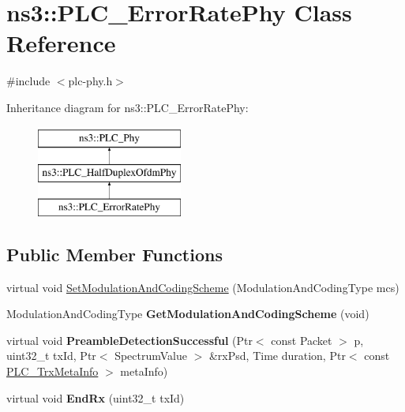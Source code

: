 \hypertarget{classns3_1_1PLC__ErrorRatePhy}{\section{ns3\-:\-:\-P\-L\-C\-\_\-\-Error\-Rate\-Phy \-Class \-Reference}
\label{classns3_1_1PLC__ErrorRatePhy}
}


{\ttfamily \#include $<$plc-\/phy.\-h$>$}

\-Inheritance diagram for ns3\-:\-:\-P\-L\-C\-\_\-\-Error\-Rate\-Phy\-:\begin{figure}[H]
\begin{center}
\leavevmode
\includegraphics[height=3.000000cm]{classns3_1_1PLC__ErrorRatePhy}
\end{center}
\end{figure}
\subsection*{\-Public \-Member \-Functions}
\begin{DoxyCompactItemize}
\item 
virtual void \hyperlink{classns3_1_1PLC__ErrorRatePhy_a108a0f187ead3c1a8aa90d03f95bd653}{\-Set\-Modulation\-And\-Coding\-Scheme} (\-Modulation\-And\-Coding\-Type mcs)
\item 
\hypertarget{classns3_1_1PLC__ErrorRatePhy_a158678f9689b9111992c3137f6a0ed57}{\-Modulation\-And\-Coding\-Type {\bfseries \-Get\-Modulation\-And\-Coding\-Scheme} (void)}\label{classns3_1_1PLC__ErrorRatePhy_a158678f9689b9111992c3137f6a0ed57}

\item 
\hypertarget{classns3_1_1PLC__ErrorRatePhy_ab7bdbe350667587e50ce06413ae2df7b}{virtual void {\bfseries \-Preamble\-Detection\-Successful} (\-Ptr$<$ const \-Packet $>$ p, uint32\-\_\-t tx\-Id, \-Ptr$<$ \-Spectrum\-Value $>$ \&rx\-Psd, \-Time duration, \-Ptr$<$ const \hyperlink{classns3_1_1PLC__TrxMetaInfo}{\-P\-L\-C\-\_\-\-Trx\-Meta\-Info} $>$ meta\-Info)}\label{classns3_1_1PLC__ErrorRatePhy_ab7bdbe350667587e50ce06413ae2df7b}

\item 
\hypertarget{classns3_1_1PLC__ErrorRatePhy_a1441d74fc6df47217973c0d9411333f5}{virtual void {\bfseries \-End\-Rx} (uint32\-\_\-t tx\-Id)}\label{classns3_1_1PLC__ErrorRatePhy_a1441d74fc6df47217973c0d9411333f5}

\end{DoxyCompactItemize}
